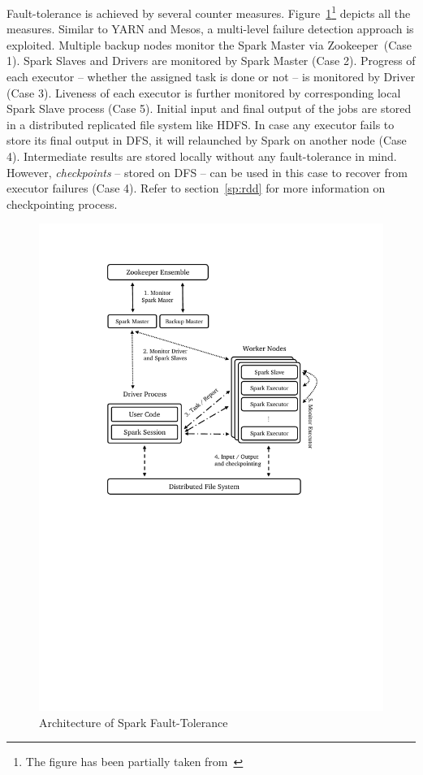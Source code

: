 \begin{description}[leftmargin=0pt]
     Fault-tolerance is achieved by several counter measures. Figure~\ref{fig:spark-full}\footnote{The figure has been partially taken from~\textcite{spark-guide}} depicts all the measures. Similar to YARN and Mesos, a multi-level failure detection approach is exploited. Multiple backup nodes monitor the Spark Master via Zookeeper~(Case 1). Spark Slaves and Drivers are monitored by Spark Master (Case 2). Progress of each executor -- whether the assigned task is done or not -- is monitored by Driver (Case 3). Liveness of each executor is further monitored by corresponding local Spark Slave process (Case 5). Initial input and final output of the jobs are stored in a distributed replicated file system like HDFS. In case any executor fails to store its final output in DFS, it will relaunched by Spark on another node (Case 4). Intermediate results are stored locally without any fault-tolerance in mind. However, \emph{checkpoints} -- stored on DFS -- can be used in this case to recover from executor failures (Case 4). Refer to section~\ref{sp:rdd} for more information on checkpointing process. 
     \begin{figure}[ht]
         \centering
         \includegraphics[clip,trim=4cm 13cm 4cm 2.2cm]{spark-full.pdf}
         \caption{Architecture of Spark Fault-Tolerance}
         \label{fig:spark-full}
     \end{figure}
\end{description}

